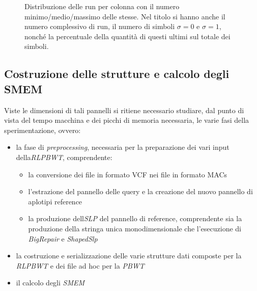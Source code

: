 \begin{figure}
\begin{subfigure}{.45\textwidth}
  \end{subfigure}
  \caption{Distribuzione delle run per colonna con il numero
    minimo/medio/massimo delle stesse. Nel titolo si hanno anche il numero
    complessivo di run, il numero di simboli $\sigma=0$ e $\sigma=1$, nonché la
    percentuale della quantità di questi ultimi sul totale dei simboli.}
  \label{fig:chrrun}
\end{figure}
\subsection{Costruzione delle strutture e calcolo degli SMEM}
Viste le dimensioni di tali pannelli si ritiene necessario studiare, dal punto
di vista del tempo macchina e dei picchi di memoria necessaria, le varie fasi
della sperimentazione, ovvero:
\begin{itemize}
  \item la fase di \textit{preprocessing}, necessaria per la preparazione dei
  vari input della\textit{RLPBWT}, comprendente: 
  \begin{itemize}
    \item la conversione dei file in formato VCF nei file in formato MACs
    \item l'estrazione del pannello delle query e la creazione del nuovo
    pannello di aplotipi reference
    \item la produzione dell\textit{SLP} del pannello di reference, comprendente
    sia la produzione della stringa unica monodimensionale che l'esecuzione di
    \textit{BigRepair} e \textit{ShapedSlp}
  \end{itemize}
  \item la costruzione e serializzazione delle varie strutture dati composte per
  la \textit{RLPBWT} e dei file ad hoc per la \textit{PBWT}
  \item il calcolo degli \textit{SMEM}
\end{itemize}
